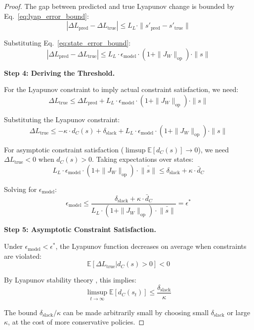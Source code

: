 \documentclass{article}
\theoremstyle{plain}
\theoremstyle{definition}
\theoremstyle{remark}
\begin{document}
\begin{proof}
The gap between predicted and true Lyapunov change is bounded by Eq.~\ref{eq:lyap_error_bound}:
\begin{equation}
|\Delta L_{\text{pred}} - \Delta L_{\text{true}}| \leq L_L \cdot \|s'_{\text{pred}} - s'_{\text{true}}\|
\end{equation}

Substituting Eq.~\ref{eq:state_error_bound}:
\begin{equation}
|\Delta L_{\text{pred}} - \Delta L_{\text{true}}| \leq L_L \cdot \epsilon_{\text{model}} \cdot (1 + \|J_W\|_{\text{op}}) \cdot \|s\|
\end{equation}

\textbf{Step 4: Deriving the Threshold.}

For the Lyapunov constraint to imply actual constraint satisfaction, we need:
\begin{equation}
\Delta L_{\text{true}} \leq \Delta L_{\text{pred}} + L_L \cdot \epsilon_{\text{model}} \cdot (1 + \|J_W\|_{\text{op}}) \cdot \|s\|
\end{equation}

Substituting the Lyapunov constraint:
\begin{equation}
\Delta L_{\text{true}} \leq -\kappa \cdot d_C(s) + \delta_{\text{slack}} + L_L \cdot \epsilon_{\text{model}} \cdot (1 + \|J_W\|_{\text{op}}) \cdot \|s\|
\end{equation}

For asymptotic constraint satisfaction ($\limsup \mathbb{E}[d_C(s)] \to 0$), we need $\Delta L_{\text{true}} < 0$ when $d_C(s) > 0$. Taking expectations over states:
\begin{equation}
L_L \cdot \epsilon_{\text{model}} \cdot (1 + \|J_W\|_{\text{op}}) \cdot \bar{\|s\|} \leq \delta_{\text{slack}} + \kappa \cdot \bar{d}_C
\end{equation}

Solving for $\epsilon_{\text{model}}$:
\begin{equation}
\epsilon_{\text{model}} \leq \frac{\delta_{\text{slack}} + \kappa \cdot \bar{d}_C}{L_L \cdot (1 + \|J_W\|_{\text{op}}) \cdot \bar{\|s\|}} = \epsilon^*
\end{equation}

\textbf{Step 5: Asymptotic Constraint Satisfaction.}

Under $\epsilon_{\text{model}} < \epsilon^*$, the Lyapunov function decreases on average when constraints are violated:
\begin{equation}
\mathbb{E}[\Delta L_{\text{true}} | d_C(s) > 0] < 0
\end{equation}

By Lyapunov stability theory \citep{khalil2002nonlinear}, this implies:
\begin{equation}
\limsup_{t \to \infty} \mathbb{E}[d_C(s_t)] \leq \frac{\delta_{\text{slack}}}{\kappa}
\end{equation}

The bound $\delta_{\text{slack}}/\kappa$ can be made arbitrarily small by choosing small $\delta_{\text{slack}}$ or large $\kappa$, at the cost of more conservative policies.
\end{proof}
\end{document}
